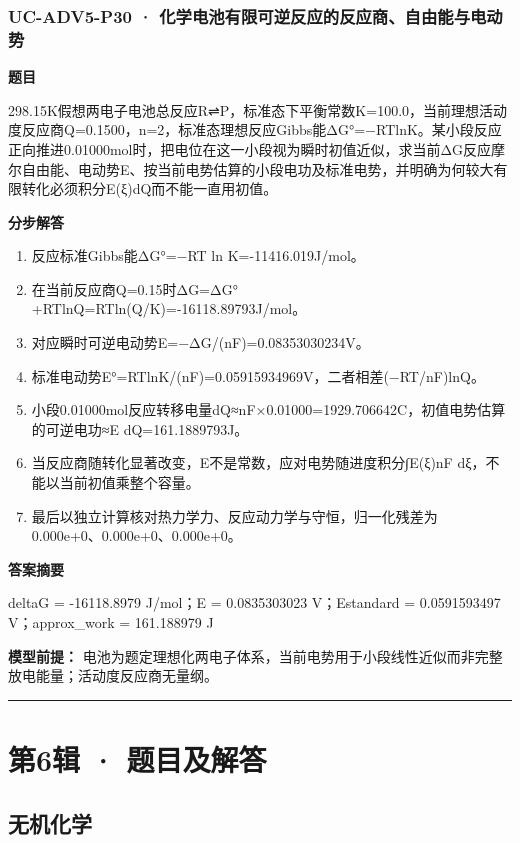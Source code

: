 \documentclass[UTF8,11pt,a4paper]{ctexart}
\begin{document}
\subsubsection*{UC-ADV5-P30 · 化学电池有限可逆反应的反应商、自由能与电动势}
\noindent\textbf{题目}\par
298.15K假想两电子电池总反应R⇌P，标准态下平衡常数K=100.0，当前理想活动度反应商Q=0.1500，n=2，标准态理想反应Gibbs能ΔG°=−RTlnK。某小段反应正向推进0.01000mol时，把电位在这一小段视为瞬时初值近似，求当前ΔG反应摩尔自由能、电动势E、按当前电势估算的小段电功及标准电势，并明确为何较大有限转化必须积分E(ξ)dQ而不能一直用初值。\par
\medskip\noindent\textbf{分步解答}
\begin{enumerate}
\item 反应标准Gibbs能ΔG°=−RT ln K=-11416.019J/mol。
\item 在当前反应商Q=0.15时ΔG=ΔG°+RTlnQ=RTln(Q/K)=-16118.89793J/mol。
\item 对应瞬时可逆电动势E=−ΔG/(nF)=0.08353030234V。
\item 标准电动势E°=RTlnK/(nF)=0.05915934969V，二者相差(−RT/nF)lnQ。
\item 小段0.01000mol反应转移电量dQ≈nF×0.01000=1929.706642C，初值电势估算的可逆电功≈E dQ=161.1889793J。
\item 当反应商随转化显著改变，E不是常数，应对电势随进度积分∫E(ξ)nF dξ，不能以当前初值乘整个容量。
\item 最后以独立计算核对热力学力、反应动力学与守恒，归一化残差为 0.000e+0、0.000e+0、0.000e+0。
\end{enumerate}
\noindent\textbf{答案摘要}\par
deltaG = -16118.8979 J/mol；E = 0.0835303023 V；Estandard = 0.0591593497 V；approx\_work = 161.188979 J\par
\noindent\textbf{模型前提：}
电池为题定理想化两电子体系，当前电势用于小段线性近似而非完整放电能量；活动度反应商无量纲。\par
\medskip\hrule\medskip
\clearpage
\section*{第6辑 · 题目及解答}
\subsection*{无机化学}
\end{document}
